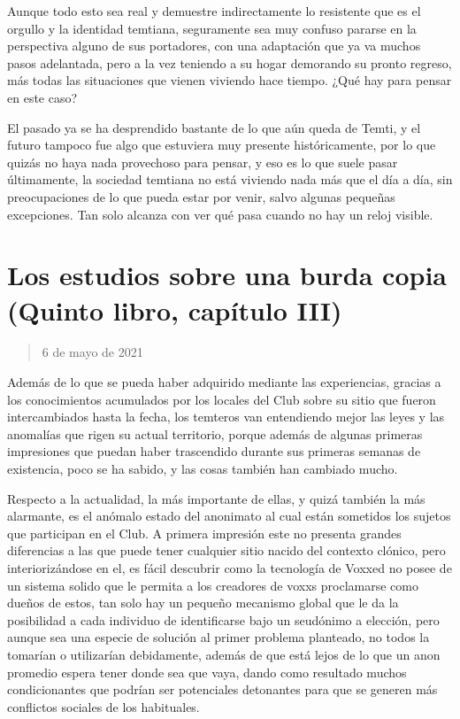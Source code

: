 \documentclass[
]{book}
\begin{document}
Aunque todo esto sea real y demuestre indirectamente lo resistente que es el orgullo y la identidad temtiana, seguramente sea muy confuso pararse en la perspectiva alguno de sus portadores, con una adaptación que ya va muchos pasos adelantada, pero a la vez teniendo a su hogar demorando su pronto regreso, más todas las situaciones que vienen viviendo hace tiempo. ¿Qué hay para pensar en este caso?

El pasado ya se ha desprendido bastante de lo que aún queda de Temti, y el futuro tampoco fue algo que estuviera muy presente históricamente, por lo que quizás no haya nada provechoso para pensar, y eso es lo que suele pasar últimamente, la sociedad temtiana no está viviendo nada más que el día a día, sin preocupaciones de lo que pueda estar por venir, salvo algunas pequeñas excepciones. Tan solo alcanza con ver qué pasa cuando no hay un reloj visible.

\hypertarget{los-estudios-sobre-una-burda-copia-quinto-libro-capuxedtulo-iii}{%
\section{Los estudios sobre una burda copia (Quinto libro, capítulo III)}\label{los-estudios-sobre-una-burda-copia-quinto-libro-capuxedtulo-iii}}

\begin{quote}
6 de mayo de 2021
\end{quote}

Además de lo que se pueda haber adquirido mediante las experiencias, gracias a los conocimientos acumulados por los locales del Club sobre su sitio que fueron intercambiados hasta la fecha, los temteros van entendiendo mejor las leyes y las anomalías que rigen su actual territorio, porque además de algunas primeras impresiones que puedan haber trascendido durante sus primeras semanas de existencia, poco se ha sabido, y las cosas también han cambiado mucho.

Respecto a la actualidad, la más importante de ellas, y quizá también la más alarmante, es el anómalo estado del anonimato al cual están sometidos los sujetos que participan en el Club. A primera impresión este no presenta grandes diferencias a las que puede tener cualquier sitio nacido del contexto clónico, pero interiorizándose en el, es fácil descubrir como la tecnología de Voxxed no posee de un sistema solido que le permita a los creadores de voxxs proclamarse como dueños de estos, tan solo hay un pequeño mecanismo global que le da la posibilidad a cada individuo de identificarse bajo un seudónimo a elección, pero aunque sea una especie de solución al primer problema planteado, no todos la tomarían o utilizarían debidamente, además de que está lejos de lo que un anon promedio espera tener donde sea que vaya, dando como resultado muchos condicionantes que podrían ser potenciales detonantes para que se generen más conflictos sociales de los habituales.
\end{document}
